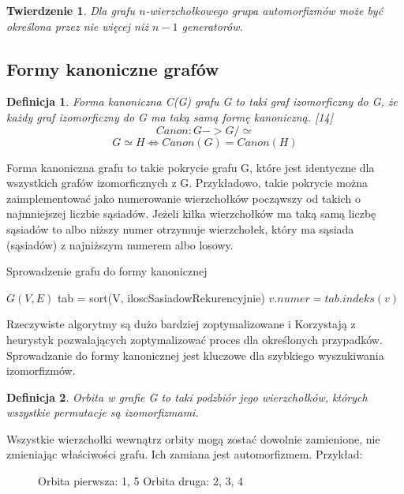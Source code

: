 \documentclass[11pt]{article}
\newtheorem{theorem}{Twierdzenie}
\newtheorem{definition}{Definicja}[section]
\begin{document}
  \begin{theorem}
    Dla grafu $n$-wierzchołkowego grupa automorfizmów może być określona przez nie więcej niż 
    $n-1$ generatorów. 
  \end{theorem}

  \subsection{Formy kanoniczne grafów}

  \begin{definition}
    Forma kanoniczna C(G) grafu G to taki graf izomorficzny do G, że każdy graf izomorficzny do G ma taką samą formę kanoniczną. 
    [14]$$ Canon \colon G -> G/ \simeq $$
    $$G \simeq H \iff Canon(G) = Canon(H) $$


  \end{definition}

  Forma kanoniczna grafu to takie pokrycie grafu G, 
  które jest identyczne dla wszystkich grafów izomorficznych z G. Przykładowo, takie pokrycie można zaimplementować
   jako numerowanie wierzchołków począwszy od takich o najmniejszej liczbie sąsiadów. 
   Jeżeli kilka wierzchołków ma taką samą liczbę sąsiadów to albo niższy numer otrzymuje wierzchołek, 
   który ma sąsiada (sąsiadów) z najniższym numerem albo losowy. 


   \begin{algorithm}
    \caption{Sprowadzenie grafu do formy kanonicznej}
    \begin{algorithmic}
    \REQUIRE $G(V, E) $
    \STATE tab = sort(V, iloscSasiadowRekurencyjnie)
      \STATE $v.numer = tab.indeks(v) $
    \ENDFOR
    \end{algorithmic}
  \end{algorithm}
  
  Rzeczywiste algorytmy są dużo bardziej zoptymalizowane i Korzystają z 
  heurystyk pozwalających zoptymalizować proces dla określonych przypadków.
  Sprowadzanie do formy kanonicznej jest kluczowe dla szybkiego wyszukiwania izomorfizmów. 

\begin{definition}
  Orbita w grafie G to taki podzbiór jego wierzchołków, których wszystkie permutacje są izomorfizmami. 
\end{definition}

Wszystkie wierzchołki wewnątrz orbity mogą zostać dowolnie zamienione, nie zmieniając właściwości grafu. Ich zamiana jest automorfizmem.
Przykład: 
\begin{figure}[H]
  \centering
    \caption{Orbita pierwsza: 1, 5 
    Orbita druga: 2, 3, 4}
 \end{figure}
\end{document}
